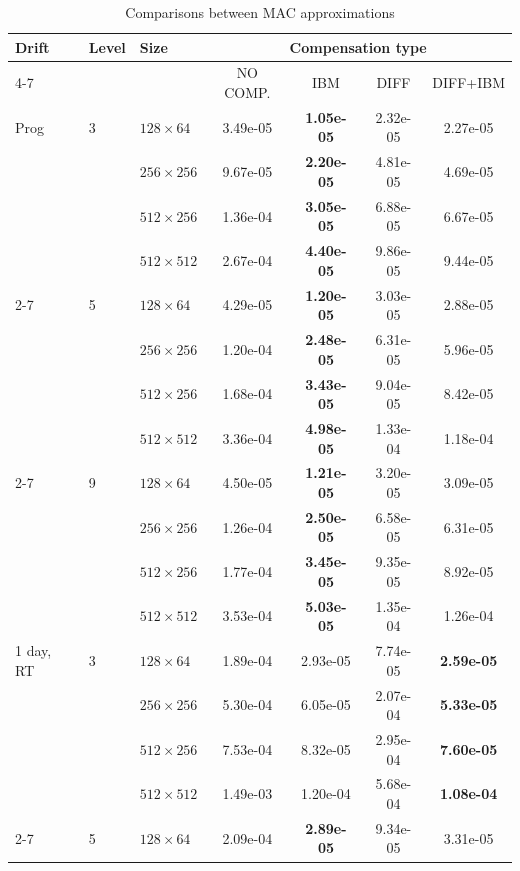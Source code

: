 \begin{table}[htb]
    \centering    
    \caption{Comparisons between MAC approximations\label{tab:tile_performances}}
    \begin{tabular}{l l l  c c c c}
    \toprule
    Drift & Level & Size & \multicolumn{4}{c}{Compensation type} \\
    \cmidrule(lr){4-7}
    & & & NO COMP. & IBM & DIFF & DIFF+IBM \\
    \midrule
    Prog & 3 & $128\times64$ & 3.49e-05 & \textbf{1.05e-05} & 2.32e-05 & 2.27e-05 \\
     &  & $256\times256$ & 9.67e-05 & \textbf{2.20e-05} & 4.81e-05 & 4.69e-05 \\
     &  & $512\times256$ & 1.36e-04 & \textbf{3.05e-05} & 6.88e-05 & 6.67e-05 \\
     &  & $512\times512$ & 2.67e-04 & \textbf{4.40e-05} & 9.86e-05 & 9.44e-05 \\
    \cmidrule(lr){2-7}
     & 5 & $128\times64$ & 4.29e-05 & \textbf{1.20e-05} & 3.03e-05 & 2.88e-05 \\
     &  & $256\times256$ & 1.20e-04 & \textbf{2.48e-05} & 6.31e-05 & 5.96e-05 \\
     &  & $512\times256$ & 1.68e-04 & \textbf{3.43e-05} & 9.04e-05 & 8.42e-05 \\
     &  & $512\times512$ & 3.36e-04 & \textbf{4.98e-05} & 1.33e-04 & 1.18e-04 \\
    \cmidrule(lr){2-7}
     & 9 & $128\times64$ & 4.50e-05 & \textbf{1.21e-05} & 3.20e-05 & 3.09e-05 \\
     &  & $256\times256$ & 1.26e-04 & \textbf{2.50e-05} & 6.58e-05 & 6.31e-05 \\
     &  & $512\times256$ & 1.77e-04 & \textbf{3.45e-05} & 9.35e-05 & 8.92e-05 \\
     &  & $512\times512$ & 3.53e-04 & \textbf{5.03e-05} & 1.35e-04 & 1.26e-04 \\
    \midrule
    1 day, RT & 3 & $128\times64$ & 1.89e-04 & 2.93e-05 & 7.74e-05 & \textbf{2.59e-05} \\
     &  & $256\times256$ & 5.30e-04 & 6.05e-05 & 2.07e-04 & \textbf{5.33e-05} \\
     &  & $512\times256$ & 7.53e-04 & 8.32e-05 & 2.95e-04 & \textbf{7.60e-05} \\
     &  & $512\times512$ & 1.49e-03 & 1.20e-04 & 5.68e-04 & \textbf{1.08e-04} \\
    \cmidrule(lr){2-7}
     & 5 & $128\times64$ & 2.09e-04 & \textbf{2.89e-05} & 9.34e-05 & 3.31e-05 \\

\end{tabular}
\end{table}
